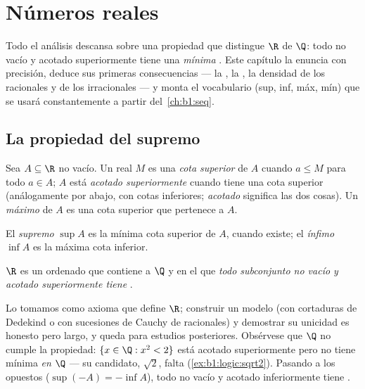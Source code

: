 \chapter{Números reales}\label{ch:b1:reals}

Todo el análisis descansa sobre una propiedad que distingue $\R$ de
$\Q$: todo  no vacío y acotado superiormente tiene una
\emph{mínima} . Este capítulo la enuncia con precisión,
deduce sus primeras consecuencias --- la , la
, la densidad de los racionales y de los irracionales ---
y monta el vocabulario (sup, inf, máx, mín) que se usará
constantemente a partir del~\cref{ch:b1:seq}.

\section{La propiedad del supremo}

\begin{definition}\label{def:b1:reals:bounds}
Sea $A \subseteq \R$ no vacío. Un real $M$ es una \emph{cota
superior} de $A$ cuando $a \leq M$ para todo
$a \in A$; $A$ está \emph{acotado superiormente} cuando tiene una cota
superior (análogamente por abajo, con cotas inferiores;
\emph{acotado} significa las dos cosas). Un \emph{máximo} de $A$ es
una cota superior que pertenece a $A$.

El \emph{supremo} $\sup A$ es la mínima cota superior
de $A$, cuando existe; el \emph{ínfimo} $\inf A$ es la
máxima cota inferior.
\end{definition}

\begin{theorem}\label{thm:b1:reals:sup}
$\R$ es un  ordenado que contiene a $\Q$ y en el que \emph{todo
subconjunto no vacío y acotado superiormente tiene
}.
\end{theorem}
\admitted

\begin{remark}
Lo tomamos como axioma que define $\R$; construir un modelo (con
cortaduras de Dedekind o con sucesiones de Cauchy de racionales) y
demostrar su unicidad es honesto pero largo, y queda para estudios
posteriores. Obsérvese que $\Q$ no cumple la propiedad:
$\{x \in \Q : x^2 < 2\}$ está acotado superiormente pero no tiene
mínima  \emph{en $\Q$} --- su candidato, $\sqrt 2$, falta
(\cref{ex:b1:logic:sqrt2}). Pasando a los opuestos
($\sup(-A) = -\inf A$), todo  no vacío y acotado inferiormente
tiene .
\end{remark}

